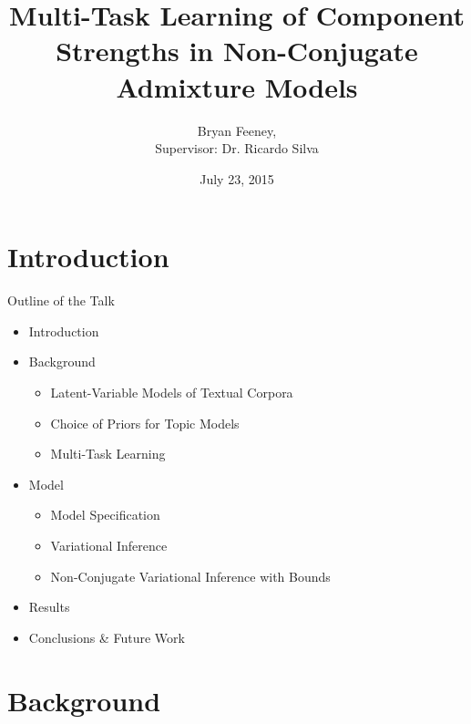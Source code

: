 \documentclass[xcolor=dvipsnames]{beamer}
\author{Bryan Feeney, \\
Supervisor: Dr. Ricardo Silva}
\title[Multitask Admixture Prediction]{Multi-Task Learning of Component Strengths in Non-Conjugate Admixture Models}
\institute[University College London]{
 University College London
}
\date[July 23, 2015]{July 23, 2015}
\begin{document}


\begin{frame}[plain]
  \titlepage
\end{frame}






\section{Introduction}
\begin{frame}{Outline of the Talk}

\begin{itemize}
    \item<1-> Introduction
    \item<2-> Background
     {
        \begin{itemize}
            \item Latent-Variable Models of Textual Corpora
            \item Choice of Priors for Topic Models
            \item Multi-Task Learning
        \end{itemize}
    }
    \item<3-> Model
     {
        \begin{itemize}
            \item Model Specification
            \item Variational Inference
            \item Non-Conjugate Variational Inference with Bounds
        \end{itemize}
    }
    \item<4-> Results
    \item<5->Conclusions \& Future Work
\end{itemize}


\end{frame}


\section{Background}
\end{document}
